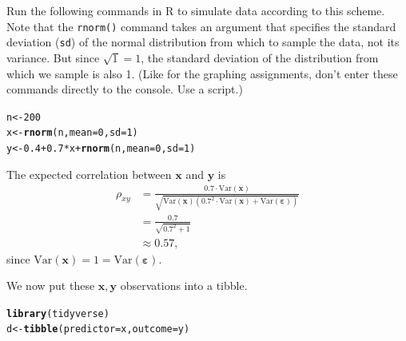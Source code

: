 \documentclass[a4paper]{tufte-book}\usepackage[]{graphicx}\usepackage[]{xcolor}
\makeatletter
\newcommand{\hlnum}[1]{\textcolor[rgb]{0.686,0.059,0.569}{#1}}%
\newcommand{\hlopt}[1]{\textcolor[rgb]{0,0,0}{#1}}%
\newcommand{\hldef}[1]{\textcolor[rgb]{0.345,0.345,0.345}{#1}}%
\newcommand{\hlkwb}[1]{\textcolor[rgb]{0.69,0.353,0.396}{#1}}%
\newcommand{\hlkwc}[1]{\textcolor[rgb]{0.333,0.667,0.333}{#1}}%
\newcommand{\hlkwd}[1]{\textcolor[rgb]{0.737,0.353,0.396}{\textbf{#1}}}%
\newenvironment{kframe}{%
 \def\at@end@of@kframe{}%
 \ifinner\ifhmode%
  \def\at@end@of@kframe{\end{minipage}}%
  \begin{minipage}{\columnwidth}%
 \fi\fi%
 \def\FrameCommand##1{\hskip\@totalleftmargin \hskip-\fboxsep
 \colorbox{shadecolor}{##1}\hskip-\fboxsep
     \hskip-\linewidth \hskip-\@totalleftmargin \hskip\columnwidth}%
 \MakeFramed {\advance\hsize-\width
   \@totalleftmargin\z@ \linewidth\hsize
   \@setminipage}}%
 {\par\unskip\endMakeFramed%
 \at@end@of@kframe}
\newenvironment{knitrout}{}{} %
\makeatother
\begin{document}
  Run the following commands in R to simulate data according to this scheme.
Note that the \texttt{rnorm()} command takes an argument that specifies the standard
  deviation (\texttt{sd}) of the normal distribution from which to sample the data,
  not its variance. But since $\sqrt{1} = 1$, the standard deviation of the
  distribution from which we sample is also 1.
  (Like for the graphing assignments, don't enter these commands directly to the console. Use a script.)

\begin{knitrout}
\color{fgcolor}\begin{kframe}
\begin{alltt}
\hldef{n} \hlkwb{<-} \hlnum{200}
\hldef{x} \hlkwb{<-} \hlkwd{rnorm}\hldef{(n,} \hlkwc{mean} \hldef{=} \hlnum{0}\hldef{,} \hlkwc{sd} \hldef{=} \hlnum{1}\hldef{)}
\hldef{y} \hlkwb{<-} \hlnum{0.4} \hlopt{+} \hlnum{0.7} \hlopt{*} \hldef{x} \hlopt{+} \hlkwd{rnorm}\hldef{(n,} \hlkwc{mean} \hldef{=} \hlnum{0}\hldef{,} \hlkwc{sd} \hldef{=} \hlnum{1}\hldef{)}
\end{alltt}
\end{kframe}
\end{knitrout}
  The expected correlation between $\bm x$ and $\bm y$ is
  \begin{align*}
    \rho_{xy} 
    &= \frac{0.7 \cdot \textrm{Var}(\bm x)}{\sqrt{\textrm{Var}(\bm x)(0.7^2 \cdot \textrm{Var}(\bm x) + \textrm{Var}(\bm \varepsilon))}} \\
    &= \frac{0.7}{\sqrt{0.7^2 + 1}} \\
    &\approx 0.57,
  \end{align*}
  since $\textrm{Var}(\bm x) = 1 = \textrm{Var}(\bm \varepsilon)$.

  We now put these $\bm x, \bm y$ observations into a tibble.

\begin{knitrout}
\color{fgcolor}\begin{kframe}
\begin{alltt}
\hlkwd{library}\hldef{(tidyverse)}
\hldef{d} \hlkwb{<-} \hlkwd{tibble}\hldef{(}\hlkwc{predictor} \hldef{= x,} \hlkwc{outcome} \hldef{= y)}
\end{alltt}
\end{kframe}
\end{knitrout}
\end{document}
